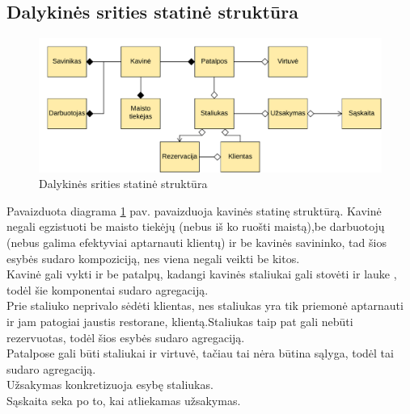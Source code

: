 \documentclass{VUMIFPSkursinis}
\begin{document}
\begin{landscape}
\subsection{Dalykinės srities statinė struktūra}

	\begin {figure}[H]
	\centering
		\caption{Dalykinės srities statinė struktūra}
		\includegraphics[scale=1]{img/3lab/Diagrama1}
		
		\label{fig:diagrama1}
	\end{figure}
\end{landscape}

Pavaizduota diagrama \ref{fig:diagrama1} pav. pavaizduoja kavinės statinę struktūrą. Kavinė negali egzistuoti be maisto tiekėjų (nebus iš ko ruošti maistą),be darbuotojų (nebus galima efektyviai aptarnauti klientų) ir be kavinės savininko, tad šios esybės sudaro kompoziciją, nes viena negali veikti be kitos.\\
Kavinė gali vykti ir be patalpų, kadangi kavinės staliukai gali stovėti ir 
lauke , todėl šie komponentai sudaro agregaciją.\\
Prie  staliuko  neprivalo  sėdėti  klientas,  nes
staliukas  yra  tik  priemonė  aptarnauti ir jam patogiai jaustis restorane,
klientą.Staliukas taip pat gali nebūti rezervuotas, todėl šios esybės sudaro agregaciją.\\
Patalpose gali būti staliukai ir virtuvė, tačiau tai nėra būtina sąlyga, todėl tai sudaro 
agregaciją.\\
Užsakymas konkretizuoja esybę staliukas.\\
Sąskaita seka po to, kai atliekamas užsakymas.\\
\end{document}
